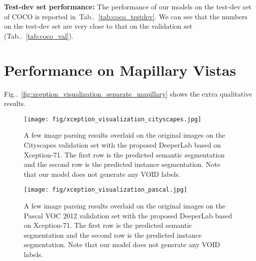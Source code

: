 \documentclass[10pt,twocolumn,letterpaper]{article}
\makeatletter
\def\@onedot{\ifx\@let@token.\else.\null\fi\xspace}
\DeclareRobustCommand\onedot{\futurelet\@let@token\@onedot}
\newcommand{\figref}[1]{Fig\onedot~\ref{#1}}
\newcommand{\tabref}[1]{Tab\onedot~\ref{#1}}
\makeatother
\begin{document}
\begin{table}[!t]
  \centering
  \caption{DeeperLab performance on the COCO test-dev set. The numbers on the test-dev set are very close to that on the validation set (\tabref{tab:coco_val}). : input size is downsampled by 2 ().}
  \label{tab:coco_testdev}
\end{table}

{\bf Test-dev set performance:} The performance of our models on the test-dev set of COCO is reported in~\tabref{tab:coco_testdev}. We can see that the numbers on the test-dev set are very close to that on the validation set (\tabref{tab:coco_val}).


\section{Performance on Mapillary Vistas}

\figref{fig:xception_visualization_separate_mapillary} shows the extra qualitative results.

\clearpage

\begin{figure*}[!t]
    \centering
    \texttt{[image: fig/xception\_visualization\_cityscapes.jpg]}
    \caption{A few image parsing results overlaid on the original images on the Cityscapes validation set with the proposed DeeperLab based on Xception-71. The first row is the predicted semantic segmentation and the second row is the predicted instance segmentation. Note that our model does not generate any VOID labels.}
    \label{fig:xception_visualization_overlay_cityscapes}
\end{figure*}

\begin{figure*}[!t]
    \centering
    \texttt{[image: fig/xception\_visualization\_pascal.jpg]}
    \caption{A few image parsing results overlaid on the original images on the Pascal VOC 2012 validation set with the proposed DeeperLab based on Xception-71. The first row is the predicted semantic segmentation and the second row is the predicted instance segmentation. Note that our model does not generate any VOID labels.}
    \label{fig:xception_visualization_overlay_pascal}
\end{figure*}
\end{document}
